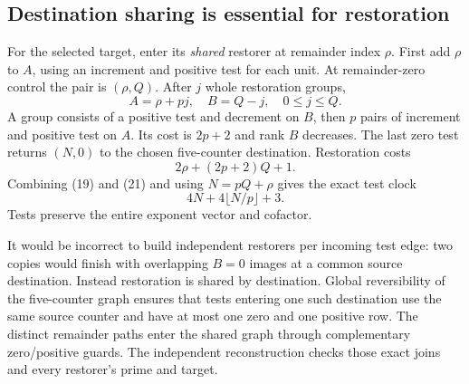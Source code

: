 \documentclass[11pt,a4paper]{article}
\numberwithin{equation}{section}
\begin{document}
\subsection{Destination sharing is essential for restoration}
For the selected target, enter its \emph{shared} restorer at remainder index
$\rho$. First add $\rho$ to $A$, using an increment and positive test for
each unit. At remainder-zero control the pair is $(\rho,Q)$. After $j$
whole restoration groups,
\[
                      A=\rho+pj,\quad B=Q-j,\quad0\le j\le Q.\tag{20}
\]
A group consists of a positive test and decrement on $B$, then $p$ pairs of
increment and positive test on $A$. Its cost is $2p+2$ and rank $B$
decreases. The last zero test returns $(N,0)$ to the chosen five-counter
destination. Restoration costs
\[
                           2\rho+(2p+2)Q+1.           \tag{21}
\]
Combining (19) and (21) and using $N=pQ+\rho$ gives the exact test clock
\[
                   4N+4\lfloor N/p\rfloor+3.          \tag{22}
\]
Tests preserve the entire exponent vector and cofactor.

It would be incorrect to build independent restorers per incoming test edge:
two copies would finish with overlapping $B=0$ images at a common source
destination. Instead restoration is shared by destination. Global
reversibility of the five-counter graph ensures that tests entering one
such destination use the same source counter and have at most one zero and
one positive row. The distinct remainder paths enter the shared graph through
complementary zero/positive guards. The independent reconstruction checks
those exact joins and every restorer's prime and target.
\end{document}
